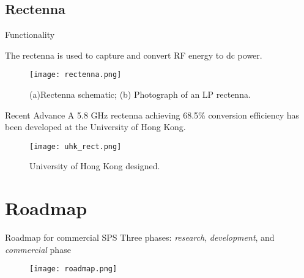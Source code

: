 \documentclass{beamer}
\begin{document}
\subsection{Rectenna}
\begin{frame}[label=rect]{Functionality}
  \begin{definition}
    The \alert{rectenna} is used to capture and convert
    RF energy to dc power.
  \end{definition}
  \begin{figure}[H]
    \centering
    {\texttt{[image: rectenna.png]}}
    \caption{\small (a)Rectenna schematic; (b) Photograph of an
    LP rectenna.\cite{MPTHMSP}}
  \end{figure}
\end{frame}
\begin{frame}[label=rectRA]{Recent Advance}
  A 5.8 GHz rectenna achieving 68.5\% conversion efficiency has been
  developed at the University of Hong Kong.\cite{DESRECT}
  \begin{figure}[H]
    \centering
    {\texttt{[image: uhk\_rect.png]}}
    \caption{\footnotesize University of Hong Kong
    designed.\cite{MPTHMSP}}
  \end{figure}
\end{frame}
\section{Roadmap}

\begin{frame}[label=roadmap]{Roadmap for commercial SPS}
  {\footnotesize Three phases: \emph{research}, \emph{development}, and
  \emph{commercial} phase}
  \begin{figure}[H]
    \centering
    \texttt{[image: roadmap.png]}
  \end{figure}
\end{frame}
\end{document}
